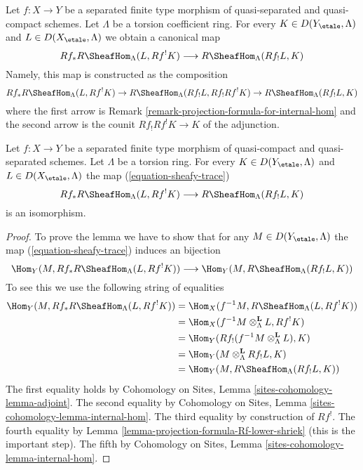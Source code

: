 \noindent
Let $f : X \to Y$ be a separated finite type morphism of quasi-separated
and quasi-compact schemes. Let $\Lambda$ be a torsion coefficient ring.
For every $K \in D(Y_\etale, \Lambda)$ and $L \in D(X_\etale, \Lambda)$
we obtain a canonical map
\begin{equation}
\label{equation-sheafy-trace}
Rf_*R\SheafHom_\Lambda(L, Rf^!K) \longrightarrow R\SheafHom_\Lambda(Rf_!L, K)
\end{equation}
Namely, this map is constructed as the composition
$$
Rf_*R\SheafHom_\Lambda(L, Rf^!K) \to
R\SheafHom_\Lambda(Rf_!L, Rf_!Rf^!K) \to
R\SheafHom_\Lambda(Rf_!L, K)
$$
where the first arrow is
Remark \ref{remark-projection-formula-for-internal-hom}
and the second arrow is the counit $Rf_!Rf^!K \to K$ of the adjunction.

\begin{lemma}
\label{lemma-iso-on-RSheafHom}
Let $f : X \to Y$ be a separated finite type morphism of quasi-compact and
quasi-separated schemes. Let $\Lambda$ be a torsion ring.
For every $K \in D(Y_\etale, \Lambda)$ and $L \in D(X_\etale, \Lambda)$
the map (\ref{equation-sheafy-trace})
$$
Rf_*R\SheafHom_\Lambda(L, Rf^!K) \longrightarrow R\SheafHom_\Lambda(Rf_!L, K)
$$
is an isomorphism.
\end{lemma}

\begin{proof}
To prove the lemma we have to show that for any $M \in D(Y_\etale, \Lambda)$
the map (\ref{equation-sheafy-trace}) induces an bijection
$$
\Hom_Y(M, Rf_*R\SheafHom_\Lambda(L, Rf^!K))
\longrightarrow
\Hom_Y(M, R\SheafHom_\Lambda(Rf_!L, K))
$$
To see this we use the following string of equalities
\begin{align*}
\Hom_Y(M, Rf_*R\SheafHom_\Lambda(L, Rf^!K))
& =
\Hom_X(f^{-1}M, R\SheafHom_\Lambda(L, Rf^!K)) \\
& =
\Hom_X(f^{-1}M \otimes_\Lambda^\mathbf{L} L, Rf^!K) \\
& =
\Hom_Y(Rf_!(f^{-1}M \otimes_\Lambda^\mathbf{L} L), K) \\
& =
\Hom_Y(M \otimes_\Lambda^\mathbf{L} Rf_!L, K) \\
& =
\Hom_Y(M, R\SheafHom_\Lambda(Rf_!L, K))
\end{align*}
The first equality holds by
Cohomology on Sites, Lemma \ref{sites-cohomology-lemma-adjoint}.
The second equality by
Cohomology on Sites, Lemma \ref{sites-cohomology-lemma-internal-hom}.
The third equality by construction of $Rf^!$.
The fourth equality by Lemma \ref{lemma-projection-formula-Rf-lower-shriek}
(this is the important step).
The fifth by
Cohomology on Sites, Lemma \ref{sites-cohomology-lemma-internal-hom}.
\end{proof}

